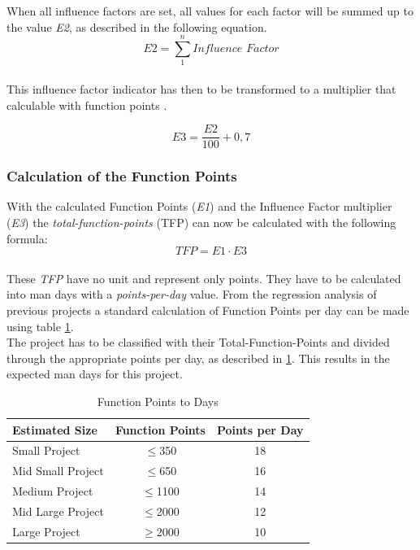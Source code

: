 When all influence factors are set, all values for each factor will be summed up to the value \textit{E2}, as described in the following equation. 
\begin{equation}
\textit{E2} =  \sum \limits_{1}^n   \textit{Influence Factor}  \label{fp:E2}
\end{equation}\\
This influence factor indicator has then to be transformed to a multiplier that calculable with function points \cite{Softwaremanagement}\cite{fpafundamentals}.  

\begin{equation}
	\textit{E3} =\frac{\textit{E2}}{100}  + 0,7 \label{fp:E3}
\end{equation}

\subsubsection{Calculation of the Function Points}

With the calculated Function Points (\textit{E1}) and the Influence Factor multiplier (\textit{E3}) the \textit{total-function-points} (TFP) can now be calculated with the following formula:
\begin{equation}
	\textit{TFP} = \textit{E1} \cdot \textit{E3}  \label{fp:TFP}
\end{equation}\\
These \textit{TFP} have no unit and represent only points. They have to be calculated into man days with a \textit{points-per-day} value. From the regression analysis of previous projects a standard calculation of Function Points per day can be made using table \ref{tab:pointsperday}.\\
The project has to be classified with their Total-Function-Points and divided through the appropriate points per day, as described in \ref{tab:pointsperday}. This results in the expected man days for this project.\\
\begin{table}[h] 
	\centering 
	\setlength{\tabcolsep}{4pt}
	\begin{tabular}{|l|c|c|}\hline
		Estimated Size    & Function Points & Points per Day\\ \hline
		Small Project     & $\le$350        & 18 \\ \hline
		Mid Small Project & $\le$650        & 16 \\ \hline
		Medium Project    & $\le$1100 		& 14 \\ \hline
		Mid Large Project & $\le$2000 		& 12\\ \hline
		Large Project     & $\ge$2000 		& 10 \\ \hline
	\end{tabular}
	\caption{Function Points to Days} 
	\label{tab:pointsperday} 
\end{table} 

